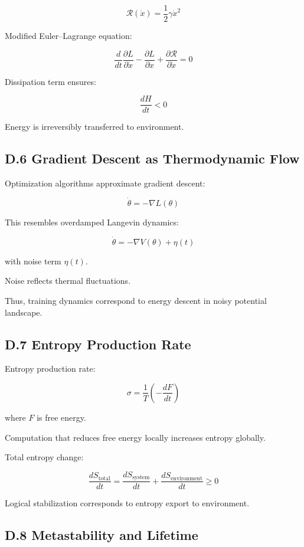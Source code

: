 \documentclass[11pt,openany]{book}
\begin{document}
\[
\mathcal{R}(\dot{x}) = \frac{1}{2} \gamma \dot{x}^2
\]

Modified Euler--Lagrange equation:

\[
\frac{d}{dt} \frac{\partial L}{\partial \dot{x}}
-
\frac{\partial L}{\partial x}
+
\frac{\partial \mathcal{R}}{\partial \dot{x}}
=
0
\]

Dissipation term ensures:

\[
\frac{dH}{dt} < 0
\]

Energy is irreversibly transferred to environment.

\subsection{D.6 Gradient Descent as Thermodynamic Flow}

Optimization algorithms approximate gradient descent:

\[
\dot{\theta} = - \nabla L(\theta)
\]

This resembles overdamped Langevin dynamics:

\[
\dot{\theta} = - \nabla V(\theta) + \eta(t)
\]

with noise term $\eta(t)$.

Noise reflects thermal fluctuations.

Thus, training dynamics correspond to energy descent 
in noisy potential landscape.

\subsection{D.7 Entropy Production Rate}

Entropy production rate:

\[
\sigma = \frac{1}{T} \left( -\frac{dF}{dt} \right)
\]

where $F$ is free energy.

Computation that reduces free energy locally 
increases entropy globally.

Total entropy change:

\[
\frac{dS_{\text{total}}}{dt}
=
\frac{dS_{\text{system}}}{dt}
+
\frac{dS_{\text{environment}}}{dt}
\ge 0
\]

Logical stabilization corresponds to 
entropy export to environment.

\subsection{D.8 Metastability and Lifetime}
\end{document}
